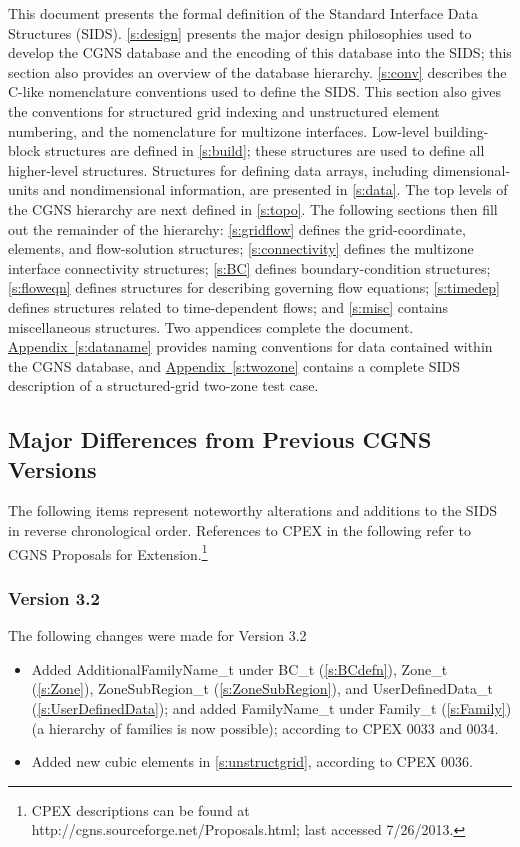 This document presents the formal definition of the Standard Interface
Data Structures (SIDS). \autoref{s:design} presents the major design
philosophies used to develop the CGNS database and the encoding of
this database into the SIDS; this section also provides an overview
of the database hierarchy. \autoref{s:conv} describes the C-like
nomenclature conventions used to define the SIDS.  This section also
gives the conventions for structured grid indexing and unstructured
element numbering, and the nomenclature for multizone interfaces.
Low-level building-block structures are defined in \autoref{s:build};
these structures are used to define all higher-level structures.
Structures for defining data arrays, including dimensional-units and
nondimensional information, are presented in \autoref{s:data}.  The
top levels of the CGNS hierarchy are next defined in \autoref{s:topo}.
The following sections then fill out the remainder of the hierarchy:
\autoref{s:gridflow} defines the grid-coordinate, elements, and
flow-solution structures; \autoref{s:connectivity} defines the
multizone interface connectivity structures; \autoref{s:BC} defines
boundary-condition structures; \autoref{s:floweqn} defines structures
for describing governing flow equations; \autoref{s:timedep} defines
structures related to time-dependent flows; and \autoref{s:misc}
contains miscellaneous structures.  Two appendices complete the
document. \hyperref[s:dataname]{Appendix~\ref*{s:dataname}} provides
naming conventions for data contained within the CGNS database, and
\hyperref[s:twozone]{Appendix~\ref*{s:twozone}} contains a complete SIDS
description of a structured-grid two-zone test case.

\subsection{Major Differences from Previous CGNS Versions}
\label{s:differences}
The following items represent noteworthy alterations and additions to
the SIDS in reverse chronological order.
References to CPEX in the following
refer to CGNS Proposals for Extension.\footnote{CPEX descriptions can be found
at http://cgns.sourceforge.net/Proposals.html; last accessed 7/26/2013.}

\subsubsection{Version 3.2}
The following changes were made for Version 3.2

\begin{itemize}
\item Added AdditionalFamilyName\_t under BC\_t (\autoref{s:BCdefn}), 
      Zone\_t (\autoref{s:Zone}), ZoneSubRegion\_t (\autoref{s:ZoneSubRegion}), 
      and UserDefinedData\_t (\autoref{s:UserDefinedData}); and added
      FamilyName\_t under Family\_t (\autoref{s:Family}) (a hierarchy of families 
      is now possible); according to CPEX 0033 and 0034.
\item Added new cubic elements in \autoref{s:unstructgrid}, according to CPEX 0036.
\end{itemize}

